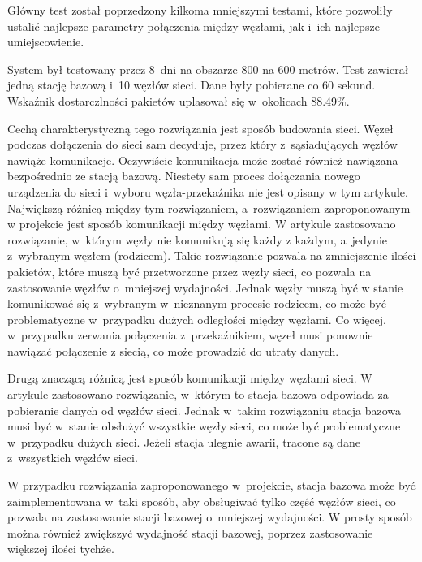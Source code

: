 Główny test został poprzedzony kilkoma mniejszymi testami, które pozwoliły ustalić najlepsze parametry połączenia między węzłami, jak i~ich najlepsze umiejscowienie.

System był testowany przez 8~dni na obszarze 800 na 600 metrów.
Test zawierał jedną stację bazową i~10 węzłów sieci.
Dane były pobierane co 60 sekund.
Wskaźnik dostarczlności pakietów uplasował się w~okolicach 88.49\%.

Cechą charakterystyczną tego rozwiązania jest sposób budowania sieci.
Węzeł podczas dołączenia do sieci sam decyduje, przez który z~sąsiadujących węzłów nawiąże komunikacje.
Oczywiście komunikacja może zostać również nawiązana bezpośrednio ze stacją bazową.
Niestety sam proces dołączania nowego urządzenia do sieci i~wyboru węzła-przekaźnika nie jest opisany w tym artykule.
Największą różnicą między tym rozwiązaniem, a~rozwiązaniem zaproponowanym w projekcie jest sposób komunikacji między węzłami.
W artykule zastosowano rozwiązanie, w~którym węzły nie komunikują się każdy z każdym, a~jedynie z~wybranym węzłem (rodzicem).
Takie rozwiązanie pozwala na zmniejszenie ilości pakietów, które muszą być przetworzone przez węzły sieci, co pozwala na zastosowanie węzłów o~mniejszej wydajności.
Jednak węzły muszą być w stanie komunikować się z~wybranym w~nieznanym procesie rodzicem, co może być problematyczne w~przypadku dużych odległości między węzłami.
Co więcej, w~przypadku zerwania połączenia z~przekaźnikiem, węzeł musi ponownie nawiązać połączenie z siecią, co może prowadzić do utraty danych.

Drugą znaczącą różnicą jest sposób komunikacji między węzłami sieci.
W artykule zastosowano rozwiązanie, w~którym to stacja bazowa odpowiada za pobieranie danych od węzłów sieci.
Jednak w~takim rozwiązaniu stacja bazowa musi być w~stanie obsłużyć wszystkie węzły sieci, co może być problematyczne w~przypadku dużych sieci.
Jeżeli stacja ulegnie awarii, tracone są dane z~wszystkich węzłów sieci.

W przypadku rozwiązania zaproponowanego w~projekcie, stacja bazowa może być zaimplementowana w~taki sposób, aby obsługiwać tylko część węzłów sieci, co pozwala na zastosowanie stacji bazowej o~mniejszej wydajności.
W prosty sposób można również zwiększyć wydajność stacji bazowej, poprzez zastosowanie większej ilości tychże.

